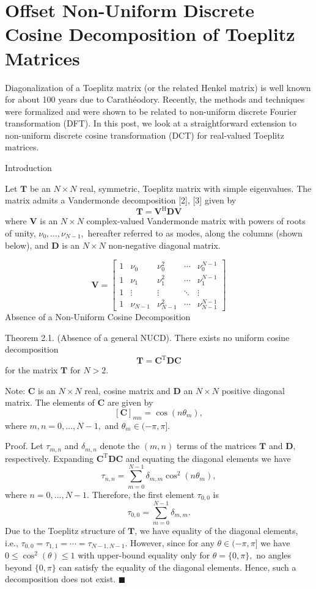 \section{Offset Non-Uniform Discrete Cosine Decomposition of Toeplitz Matrices}

Diagonalization of a Toeplitz matrix (or the related Henkel matrix) is well known for about 100 years due to Carathéodory. Recently, the methods and techniques were formalized and were shown to be related to non-uniform discrete Fourier transformation (DFT). In this post, we look at a straightforward extension to non-uniform discrete cosine transformation (DCT) for real-valued Toeplitz matrices.

Introduction

Let $\boldsymbol{T}$ be an $N\times N$ real, symmetric, Toeplitz matrix with simple eigenvalues. The matrix admits a Vandermonde decomposition [2], [3] given by \[\boldsymbol{T} = \boldsymbol{V}^\text{H} \boldsymbol{D} \boldsymbol{V}\] where $\boldsymbol{V}$ is an $N\times N$ complex-valued Vandermonde matrix with powers of roots of unity, $\nu_0, \dots, \nu_{N-1},$ hereafter referred to as modes, along the columns (shown below), and $\boldsymbol{D}$ is an $N\times N$ non-negative diagonal matrix.

\[
\boldsymbol{V} = \begin{bmatrix} 1 & \nu_0 & \nu_0^2 & \cdots & \nu_0^{N-1} \\
	1 & \nu_1 & \nu_1^2 & \cdots & \nu_1^{N-1} \\
	1 & \vdots &  \vdots & \ddots & \vdots \\
	1 & \nu_{N-1} & \nu_{N-1}^2 & \cdots & \nu_{N-1}^{N-1}
\end{bmatrix}
\]
Absence of a Non-Uniform Cosine Decomposition

Theorem 2.1. (Absence of a general NUCD). There exists no uniform cosine decomposition \[\boldsymbol{T} = \boldsymbol{C}^\text{T} \boldsymbol{D} \boldsymbol{C}\] for the matrix $\boldsymbol{T}$ for $N > 2.$

Note: $\boldsymbol{C}$ is an $N\times N$ real, cosine matrix and $\boldsymbol{D}$ an $N\times N$ positive diagonal matrix. The elements of $\boldsymbol{C}$ are given by  \[ [\boldsymbol{C}]_{mn} = \cos(n \theta_m), \]
where $m, n = 0,\dots, N - 1,$ and $\theta_m \in (-\pi,\pi].$

Proof. Let $\tau_{m,n}$ and $\delta_{ m,n}$ denote the $(m,n)$ terms of the matrices $\boldsymbol{T}$ and $\boldsymbol{D},$ respectively. Expanding $\boldsymbol{C}^\text{T} \boldsymbol{D} \boldsymbol{C}$ and equating the diagonal elements we have \[ \tau_{n,n} = \sum_{m=0}^{N-1} \delta_{m,m} \cos^2 (n \theta_m),\]
where $n = 0,\dots,N-1.$ Therefore, the first element $\tau_{0,0}$ is \[\tau_{0,0} = \sum_{m=0}^{N-1} \delta_{m,m}.\] Due to the Toeplitz structure of $\boldsymbol{T}$, we have equality of the diagonal elements, i.e., $\tau_{0,0} = \tau_{1,1} = \cdots = \tau_{N-1,N-1}.$ However, since for any $\theta \in (-\pi,\pi]$ we have $0 \leq \cos^2 (\theta ) \leq 1$ with upper-bound equality only for $\theta = \{0,\pi\},$ no angles beyond $\{0,\pi\}$ can satisfy the equality of the diagonal elements. Hence, such a decomposition does not exist. $\blacksquare$


